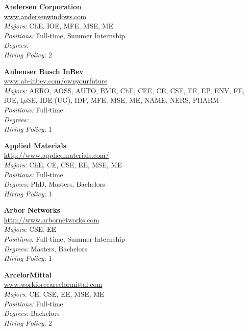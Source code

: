 \documentclass{article}
\begin{document}
\begin{center}
\begin{multicols}{3}
\begin{minipage}{.9\columnwidth}{\Large\bf Andersen Corporation }\\
	\url{www.andersenwindows.com}\\
	\emph{Majors:} ChE, IOE, MFE, MSE, ME\\
	\emph{Positions:} Full-time, Summer Internship\\
	\emph{Degrees:} \\
	\emph{Hiring Policy:} 2\\
\end{minipage}
 
\begin{minipage}{.9\columnwidth}{\Large\bf Anheuser Busch InBev }\\
	\url{www.ab-inbev.com/ownyourfuture}\\
	\emph{Majors:} AERO, AOSS, AUTO, BME, ChE, CEE, CE, CSE, EE, EP, ENV, FE, IOE, I$\mu$SE, IDE (UG), IDP, MFE, MSE, ME, NAME, NERS, PHARM\\
	\emph{Positions:} Full-time\\
	\emph{Degrees:} \\
	\emph{Hiring Policy:} 1\\
\end{minipage}
 
\begin{minipage}{.9\columnwidth}{\Large\bf Applied Materials }\\
	\url{http://www.appliedmaterials.com/}\\
	\emph{Majors:} ChE, CE, CSE, EE, MSE, ME\\
	\emph{Positions:} Full-time\\
	\emph{Degrees:} PhD, Masters, Bachelors\\
	\emph{Hiring Policy:} 1\\
\end{minipage}
 
\begin{minipage}{.9\columnwidth}{\Large\bf Arbor Networks }\\
	\url{http://www.arbornetworks.com}\\
	\emph{Majors:} CSE, EE\\
	\emph{Positions:} Full-time, Summer Internship\\
	\emph{Degrees:} Masters, Bachelors\\
	\emph{Hiring Policy:} 1\\
\end{minipage}
 
\begin{minipage}{.9\columnwidth}{\Large\bf ArcelorMittal }\\
	\url{www.workforcearcelormittal.com}\\
	\emph{Majors:} CE, CSE, EE, MSE, ME\\
	\emph{Positions:} Full-time\\
	\emph{Degrees:} Bachelors\\
	\emph{Hiring Policy:} 2\\
\end{minipage}
 

\end{multicols}
\end{center}
\end{document}
